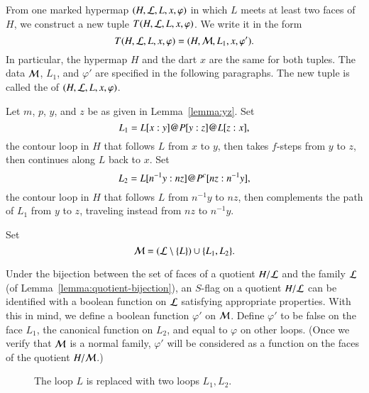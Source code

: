 \begin{definition}[transform]
From one marked hypermap $(H,{\cal L},L,x,\varphi)$ in
which $L$ meets at least two faces of $H$, we construct a new tuple 
$T(H,{\cal L},L,x,\varphi)$.  We write it in the form
\begin{displaymath}
T(H,{\cal L},L,x,\varphi) = (H,{\cal M},L_1,x,\varphi').
\end{displaymath}
In particular, the hypermap $H$ and the dart $x$ are
the same for both tuples.   The data ${\cal M}$, $L_1$, and $\varphi'$ are specified
in the following paragraphs.
The new tuple is called the  of $(H,{\cal L},L,x,\varphi)$.
\end{definition}

Let $m$, $p$, $y$, and $z$ be as given in
Lemma~\ref{lemma:yz}.
Set
\begin{displaymath}
L_1 = L[x:y] {{\operatorname{@}}} P[y:z] {{\operatorname{@}}} L[z:x],
\end{displaymath}
the contour loop in $H$ that follows $L$ from $x$ to $y$, then takes
$f$-steps from $y$ to $z$, then continues along $L$ back to $x$.  
Set 
\begin{displaymath}
L_2 = L[n^{-1}y:n z] {{\operatorname{@}}} P^c[n z:n^{-1}y],
\end{displaymath}
the contour loop in $H$ that follows $L$ from $n^{-1} y$ to $n z$,
then complements the path of $L_1$ from $y$ to $z$, traveling instead
from $n z$ to $n^{-1} y$. 


Set
\begin{displaymath}{\cal M} = ({\cal L}\setminus \{L\}) \cup
\{L_1,L_2\}.\end{displaymath}

  Under the bijection between the set of faces of a quotient $H/{\cal
    L}$ and the family ${\cal L}$ (of
  Lemma~\ref{lemma:quotient-bijection}), an $S$-flag on a quotient
  $H/{\cal L}$ can be identified with a boolean function on ${\cal L}$
  satisfying appropriate properties.  With this in mind, we define a boolean function $\varphi'$
on $\cal M$.
Define $\varphi'$ to be false on
the face $L_1$, the canonical function on $L_2$, and equal to
$\varphi$ on other loops. (Once we verify that ${\cal M}$ is a
normal family,  $\varphi'$ will be considered as a function on
the faces of the quotient $H/{\cal M}$.)  
%
%




\begin{figure}[htb]
\centering
{}
\caption{The loop $L$ is replaced with two loops $L_1, L_2$.}
\label{fig:L1L2}
\end{figure}



